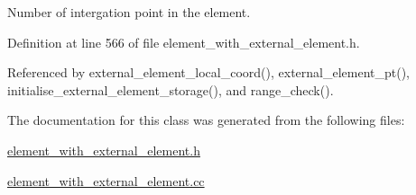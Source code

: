 Number of intergation point in the element. 



Definition at line 566 of file element\+\_\+with\+\_\+external\+\_\+element.\+h.



Referenced by external\+\_\+element\+\_\+local\+\_\+coord(), external\+\_\+element\+\_\+pt(), initialise\+\_\+external\+\_\+element\+\_\+storage(), and range\+\_\+check().



The documentation for this class was generated from the following files\+:\begin{DoxyCompactItemize}
\item 
\hyperlink{element__with__external__element_8h}{element\+\_\+with\+\_\+external\+\_\+element.\+h}\item 
\hyperlink{element__with__external__element_8cc}{element\+\_\+with\+\_\+external\+\_\+element.\+cc}\end{DoxyCompactItemize}
